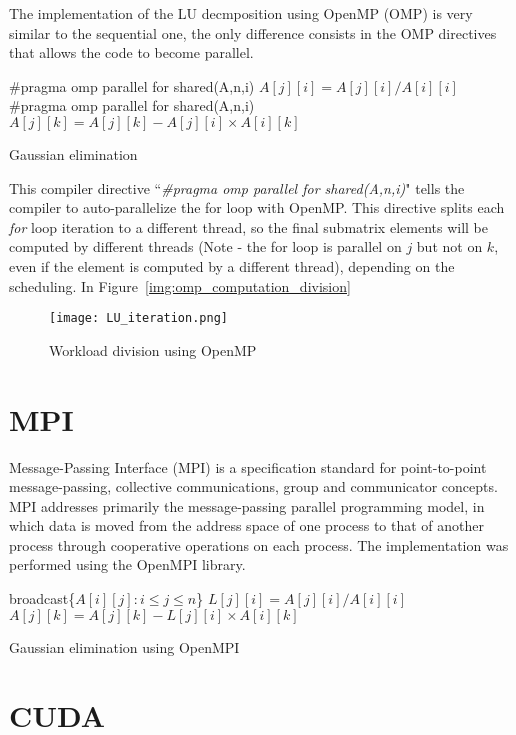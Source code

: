 The implementation of the LU decmposition using OpenMP (OMP) is very similar to the sequential one, the only difference consists in the OMP directives that allows the code to become parallel.

\begin{algorithm}
\begin{algorithmic}
	\State \#pragma omp parallel for shared(A,n,i)
		\State $A[j][i] = A[j][i] / A[i][i]$ 
	\EndFor
	\State \#pragma omp parallel for shared(A,n,i)
			\State $A[j][k] = A[j][k] - A[j][i] \times A[i][k]$ 
		\EndFor	
	\EndFor
\EndFor
\end{algorithmic}
\caption{Gaussian elimination}
\label{alg:omp_code}
\end{algorithm}

This compiler directive ``\textit{\#pragma omp parallel for shared(A,n,i)}" tells the compiler to auto-parallelize the for loop with OpenMP. This directive splits each \textit{for} loop iteration to a different thread, so the final submatrix elements will be computed by different threads (Note - the for loop is parallel on $j$ but not on $k$, even if the element is computed by a different thread), depending on the scheduling. In Figure~\ref{img:omp_computation_division}


\begin{figure}[H]
\centering
\texttt{[image: LU\_iteration.png]}
\caption{Workload division using OpenMP}
\end{figure}



\section{MPI}

Message-Passing Interface (MPI) is a specification standard for point-to-point message-passing, collective communications, group and communicator concepts. MPI addresses primarily the message-passing parallel programming model, in which data is moved from the address space of one process to that of another process through cooperative operations on each process. The implementation was performed using the OpenMPI library.

\begin{algorithm}
\begin{algorithmic}
	\State broadcast\{$A[i][j] : i \leq j \leq n $\}
		\State $L[j][i] = A[j][i] / A[i][i]$ 
	\EndFor
			\State $A[j][k] = A[j][k] - L[j][i] \times A[i][k]$ 
		\EndFor	
	\EndFor
\EndFor
\end{algorithmic}
\caption{Gaussian elimination using OpenMPI}
\label{alg:mpi_code}
\end{algorithm}


\section{CUDA}